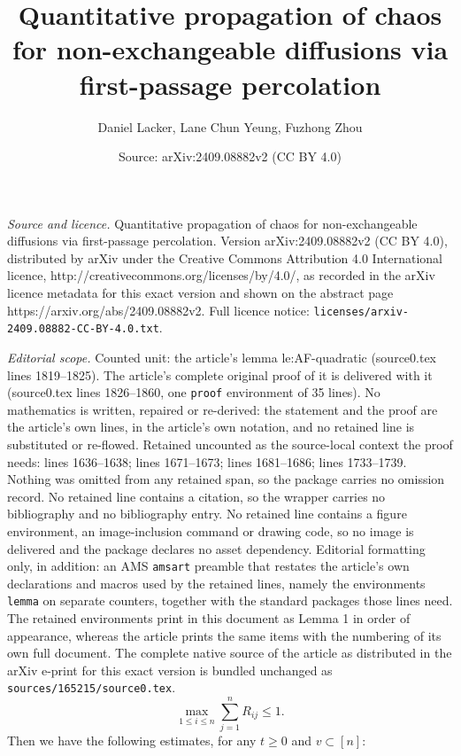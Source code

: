 \documentclass[10pt,a4paper]{amsart}
\title{Quantitative propagation of chaos for non-exchangeable diffusions via first-passage percolation}
\author{Daniel Lacker, Lane Chun Yeung, Fuzhong Zhou}
\date{Source: arXiv:2409.08882v2 (CC BY 4.0)}
\begin{document}
\maketitle

\noindent\emph{Source and licence.} Quantitative propagation of chaos for non-exchangeable diffusions via first-passage percolation. Version arXiv:2409.08882v2 (CC BY 4.0), distributed by arXiv under the Creative Commons Attribution 4.0 International licence, http://creativecommons.org/licenses/by/4.0/, as recorded in the arXiv licence metadata for this exact version and shown on the abstract page https://arxiv.org/abs/2409.08882v2. Full licence notice: \texttt{licenses/arxiv-2409.08882-CC-BY-4.0.txt}.\par\smallskip

\noindent\textit{Editorial scope.} Counted unit: the article's lemma le:AF-quadratic (source0.tex lines 1819--1825). The article's complete original proof of it is delivered with it (source0.tex lines 1826--1860, one \texttt{proof} environment of 35 lines). No mathematics is written, repaired or re-derived: the statement and the proof are the article's own lines, in the article's own notation, and no retained line is substituted or re-flowed.  Retained uncounted as the source-local context the proof needs: lines 1636--1638; lines 1671--1673; lines 1681--1686; lines 1733--1739.  Nothing was omitted from any retained span, so the package carries no omission record.  No retained line contains a citation, so the wrapper carries no bibliography and no bibliography entry.  No retained line contains a figure environment, an image-inclusion command or drawing code, so no image is delivered and the package declares no asset dependency.  Editorial formatting only, in addition: an AMS \texttt{amsart} preamble that restates the article's own declarations and macros used by the retained lines, namely the environments \texttt{lemma} on separate counters, together with the standard packages those lines need.  The retained environments print in this document as Lemma 1 in order of appearance, whereas the article prints the same items with the numbering of its own full document.  The complete native source of the article as distributed in the arXiv e-print for this exact version is bundled unchanged as \texttt{sources/165215/source0.tex}.
			\begin{equation} \tag{R-rows}
		\max_{1\leq i\leq n} \sum_{j=1}^n R_{ij} \leq 1. \label{cond:R row.sum}
	\end{equation}  Then we have the following estimates, for any $t \ge 0$ and $v \subset [n]$:
\end{document}
